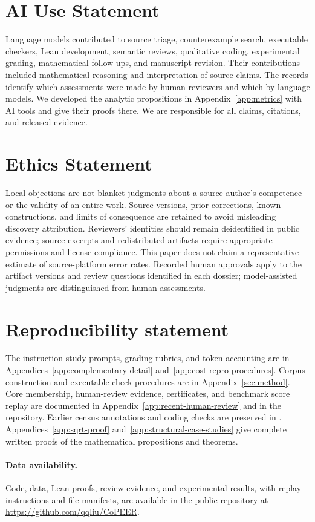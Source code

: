 \section*{AI Use Statement}
Language models contributed to source triage, counterexample search, executable checkers, Lean development, semantic reviews, qualitative coding, experimental grading, mathematical follow-ups, and manuscript revision. Their contributions included mathematical reasoning and interpretation of source claims. The records identify which assessments were made by human reviewers and which by language models. We developed the analytic propositions in Appendix~\ref{app:metrics} with AI tools and give their proofs there. We are responsible for all claims, citations, and released evidence.

\section*{Ethics Statement}
Local objections are not blanket judgments about a source author's competence or the validity of an entire work. Source versions, prior corrections, known constructions, and limits of consequence are retained to avoid misleading discovery attribution. Reviewers' identities should remain deidentified in public evidence; source excerpts and redistributed artifacts require appropriate permissions and license compliance. This paper does not claim a representative estimate of source-platform error rates. Recorded human approvals apply to the artifact versions and review questions identified in each dossier; model-assisted judgments are distinguished from human assessments.

\section*{Reproducibility statement}
The instruction-study prompts, grading rubrics, and token accounting are in
Appendices~\ref{app:complementary-detail} and~\ref{app:cost-repro-procedures}.
Corpus construction and executable-check procedures are in Appendix~\ref{sec:method}.
Core membership, human-review evidence, certificates, and benchmark score replay are
documented in Appendix~\ref{app:recent-human-review} and in the repository.
Earlier census annotations and coding checks are preserved in
\mbox{}. Appendices~\ref{app:sqrt-proof} and~\ref{app:structural-case-studies} give complete written proofs of the mathematical propositions and theorems.


\paragraph{Data availability.} Code, data, Lean proofs, review evidence, and experimental results, with replay instructions and file manifests, are available in the public repository at \mbox{\url{https://github.com/qqliu/CoPEER}}.
